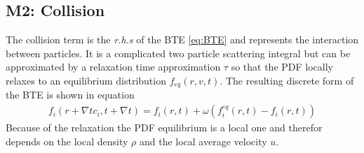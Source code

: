 \documentclass[a4paper,11pt]{article}
\begin{document}
\subsection{M2: Collision}
The collision term is the \textit{r.h.s} of the BTE \ref{eq:BTE} and represents the interaction between particles.
It is a complicated two particle scattering integral but can be approximated by a relaxation time approximation $\tau$ so that the PDF locally relaxes to an equilibrium distribution $f_{eq}(r,v,t)$.
The resulting discrete form of the BTE is shown in equation
\begin{equation}
  \label{eq:btw-discrete}
  \begin{aligned}
    f_{i}(r+ \nabla t c_{i},t+\nabla t)=f_{i}(r,t) + \omega \left( f_{i}^{eq}(r,t) - f_{i}(r,t) \right)
  \end{aligned}
\end{equation}
Because of the relaxation the PDF equilibrium is a local one and therefor depends on the local density $\rho$ and the local average velocity $u$.
\end{document}
